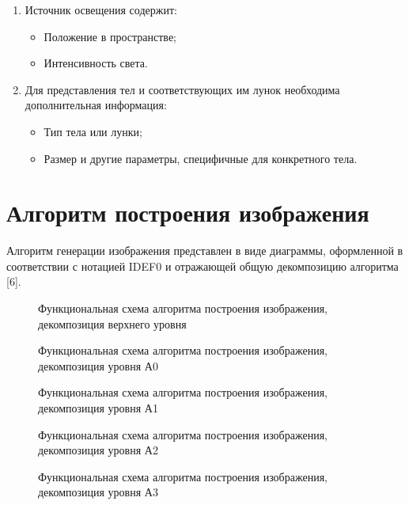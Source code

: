 \begin{enumerate}
    \item Источник освещения содержит:
    
    \begin{itemize}
        \item Положение в пространстве;
        \item Интенсивность света.
    \end{itemize}
    
    \item Для представления тел и соответствующих им лунок необходима дополнительная информация:
    
    \begin{itemize}
        \item Тип тела или лунки;
        \item Размер и другие параметры, специфичные для конкретного тела.
    \end{itemize}
\end{enumerate}
\section{Алгоритм построения изображения}

Алгоритм генерации изображения представлен в виде диаграммы, оформленной в соответствии с нотацией IDEF0 и отражающей общую декомпозицию алгоритма [6].
\begin{figure}[h]
	\centering
	
	\caption{Функциональная схема алгоритма построения изображения, декомпозиция верхнего уровня}
	\label{fig:classic}
\end{figure}
\begin{figure}[h]
	\centering
	
	\caption{Функциональная схема алгоритма построения изображения, декомпозиция уровня А0}
	\label{fig:classic}
\end{figure}
\begin{figure}[h]
	\centering
    
	\caption{Функциональная схема алгоритма построения изображения, декомпозиция уровня А1}
	\label{fig:classic}
\end{figure}
\begin{figure}[h]
	\centering
    
	\caption{Функциональная схема алгоритма построения изображения, декомпозиция уровня А2}
	\label{fig:classic}
\end{figure}
\begin{figure}[h]
	\centering
    
	\caption{Функциональная схема алгоритма построения изображения, декомпозиция уровня А3}
	\label{fig:classic}
\end{figure}
\clearpage

